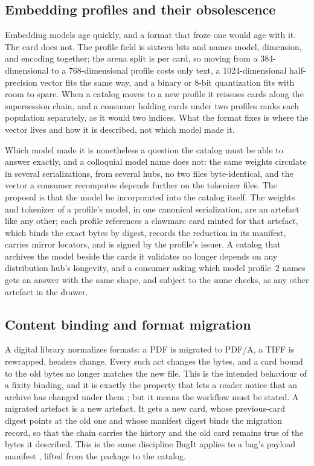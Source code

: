 \documentclass[sigconf]{acmart}
\begin{document}
\subsection{Embedding profiles and their obsolescence}
\label{sec:profiles}

Embedding models age quickly, and a format that froze one would age with it.
The card does not. The profile field is sixteen bits and names model,
dimension, and encoding together; the arena split is per card, so moving from
a 384-dimensional to a 768-dimensional profile costs only text, a
1024-dimensional half-precision vector fits the same way, and a binary or
8-bit quantization fits with room to spare.
When a catalog moves to a new profile it reissues cards along the supersession
chain, and a consumer holding cards under two profiles ranks each population
separately, as it would two indices. What the format fixes is where the vector
lives and how it is described, not which model made it.

Which model made it is nonetheless a question the catalog must be able to
answer exactly, and a colloquial model name does not: the same weights
circulate in several serializations, from several hubs, no two files
byte-identical, and the vector a consumer recomputes depends further on the
tokenizer files. The proposal is that the model be incorporated into the
catalog itself. The weights and tokenizer of a profile's model, in one
canonical serialization, are an artefact like any other; each profile
references a clawmarc card minted for that artefact, which binds the exact
bytes by digest, records the reduction in its manifest, carries mirror
locators, and is signed by the profile's issuer. A catalog that archives the
model beside the cards it validates no longer depends on any distribution
hub's longevity, and a consumer asking which model profile~2 names gets an
answer with the same shape, and subject to the same checks, as any other
artefact in the drawer.

\subsection{Content binding and format migration}

A digital library normalizes formats: a PDF is migrated to PDF/A, a TIFF is
rewrapped, headers change. Every such act changes the bytes, and a card bound
to the old bytes no longer matches the new file. This is the intended
behaviour of a fixity binding, and it is exactly the property that lets a
reader notice that an archive has changed under them \cite{Lerner:2017,
Aturban:2019}; but it means the workflow must be stated. A migrated artefact
is a new artefact. It gets a new card, whose previous-card digest points at the
old one and whose manifest digest binds the migration record, so that the
chain carries the history and the old card remains true of the bytes it
described. This is the same discipline BagIt applies to a bag's payload
manifest \cite{Kunze:2018}, lifted from the package to the catalog.
\end{document}
